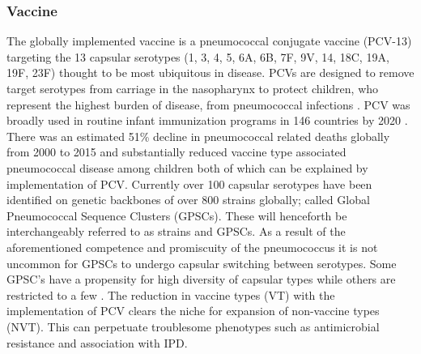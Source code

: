 \documentclass{article}
\begin{document}
\subsubsection{Vaccine} 
The globally implemented vaccine is a pneumococcal conjugate vaccine (PCV-13) targeting the 13 capsular serotypes (1, 3, 4, 5, 6A, 6B, 7F, 9V, 14, 18C, 19A, 19F, 23F) thought to be most ubiquitous in disease\cite{VaccineInformationStatement2019}. PCVs are designed to remove target serotypes from carriage in the nasopharynx to protect children, who represent the highest burden of disease, from pneumococcal infections \cite{bogaertStreptococcusPneumoniaeColonisation2004,wyllieMolecularSurveillanceStreptococcus2016}. PCV was broadly used in routine infant immunization programs in 146 countries by 2020 \cite{VaccineInformationStatement2019}. There was an estimated 51\% decline in pneumococcal related deaths globally from 2000 to 2015 and substantially reduced vaccine type associated pneumococcal disease among children both of which can be explained by implementation of PCV\cite{wahlBurdenStreptococcusPneumoniae2018, pilishviliSustainedReductionsInvasive2010,vongottbergEffectsVaccinationInvasive2014}. Currently over 100 capsular serotypes have been identified on genetic backbones of over 800 strains globally; called Global Pneumococcal Sequence Clusters (GPSCs)\cite{gladstoneInternationalGenomicDefinition2019b}. These will henceforth be interchangeably referred to as strains and GPSCs. As a result of the aforementioned competence and promiscuity of the pneumococcus it is not uncommon for GPSCs to undergo capsular switching between serotypes. Some GPSC’s have a propensity for high diversity of capsular types while others are restricted to a few \cite{loPneumococcalLineagesAssociated2019}. The reduction in vaccine types (VT) with the implementation of PCV clears the niche for expansion of non-vaccine types (NVT). This can perpetuate troublesome phenotypes such as antimicrobial resistance and association with IPD.
\end{document}
